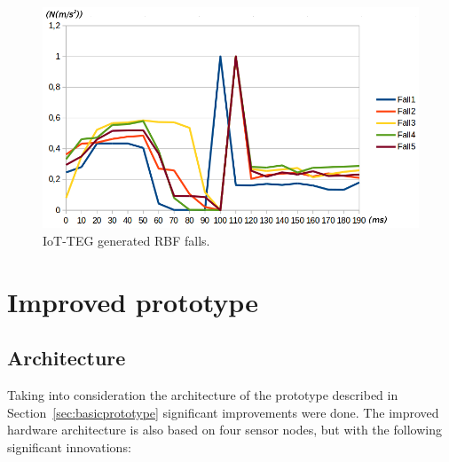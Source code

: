 \documentclass[journal]{IEEEtran}
\begin{document}
\begin{figure}[!ht]
  \centering
  \includegraphics[scale=0.25]{img/IoTTEGRBFGeneratedEvents}
  \caption[IoT-TEG generated RBF falls]{IoT-TEG generated RBF falls.}
  \label{fig:IoTTEGRBFGeneratedEvents}
\end{figure}

\section{Improved prototype}
\label{sec:improvedprototype}

\subsection{Architecture}
\label{sub:improvedprototypearchitecture}

Taking into consideration the architecture of the prototype described in Section~\ref{sec:basicprototype} 
significant improvements were done. The improved hardware architecture is also 
based on four sensor nodes, but with the following significant innovations:
\end{document}
